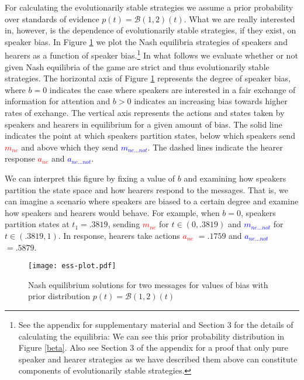 \documentclass[linguex]{sp}
\theoremstyle{definition} \newtheorem{definition}{Definition}
\begin{document}
For calculating the evolutionarily stable strategies we assume a prior probability over standards of evidence $p(t) = \mathcal{B}(1,2)(t)$.  What we are really interested in, however, is the dependence of evolutionarily stable strategies, if they exist, on speaker bias. In Figure \ref{ess-plot} we plot the Nash equilibria strategies of speakers and hearers as a function of speaker bias.\footnote{See the appendix for supplementary material and Section 3 for the details of calculating the equilibria:  We can see this prior probability distribution in Figure \ref{beta}. Also see Section 3 of the appendix for a proof that only pure speaker and hearer strategies as we have described them above can constitute components of evolutionarily stable strategies.}  In what follows we evaluate whether or not given Nash equilibria of the game are strict and thus evolutionarily stable strategies. The horizontal axis of Figure \ref{ess-plot} represents the degree of speaker bias, where $b=0$ indicates the case where speakers are interested in a fair exchange of information for attention and $b > 0$ indicates an increasing bias towards higher rates of exchange. The vertical axis represents the actions and states taken by speakers and hearers in equilibrium for a given amount of bias. The solid line indicates the point at which speakers partition states, below which speakers send \emph{\textcolor{red}{$m_{ne}$}} and above which they send \emph{\textcolor{blue}{$m_{ne...not}$}}. The dashed lines indicate the hearer response \emph{\textcolor{red}{$a_{ne}$}} and \emph{\textcolor{blue}{$a_{ne...not}$}}.  

We can interpret this figure by fixing a value of $b$ and examining how speakers partition the state space and how hearers respond to the messages.  That is, we can imagine a scenario where speakers are biased to a certain degree and examine how speakers and hearers would behave. For example, when $b=0$, speakers partition states at $t_1 = .3819$, sending \emph{\textcolor{red}{$m_{ne}$}} for $t \in (0, .3819)$ and \emph{\textcolor{blue}{$m_{ne...not}$}} for $t \in (.3819, 1)$. In response, hearers take actions \emph{\textcolor{red}{$a_{ne}$}} $=.1759$ and \emph{\textcolor{blue}{$a_{ne...not}$}} $ =.5879$. 

\begin{figure}
\begin{center}
	\texttt{[image: ess-plot.pdf]}
	\caption{Nash equilibrium solutions for two messages for values of bias with prior distribution $p(t) = \mathcal{B}(1,2)(t)$}
	\label{ess-plot}
\end{center}
\end{figure}
\end{document}
